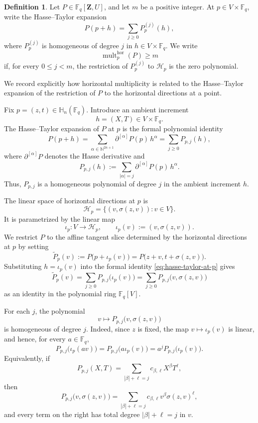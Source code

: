 \documentclass[11pt,letterpaper]{amsart}
\numberwithin{equation}{section}
\theoremstyle{definition}
\newtheorem{definition}[definition]{Definition}
\theoremstyle{remark}
\newcommand{\Fq}{\mathbb F_q}
\newcommand{\HH}{\mathbb H}
\begin{document}
\begin{definition}
\label{def:horizontal-multiplicity}
Let $P\in\Fq[\mathbf Z,U]$, and let $m$ be a positive integer.  At
$p\in V\times\Fq$, write the Hasse--Taylor expansion
\begin{equation}\label{eq:Hasse-expansion}
 P(p+h)=\sum_{j\geq0}P_p^{(j)}(h),
\end{equation}
where $P_p^{(j)}$ is homogeneous of degree $j$ in
$h\in V\times\Fq$. We write
\[
 \operatorname{mult}^{\mathrm{hor}}_p(P)\geq m
\]
if, for every $0\leq j<m$, the restriction of $P_p^{(j)}$ to
$\mathcal H_p$ is the zero polynomial.
\end{definition}
We record explicitly how horizontal multiplicity is related to the
Hasse--Taylor expansion of the restriction of $P$ to the horizontal
directions at a point.

Fix $p=(z,t)\in\HH_n(\Fq)$. Introduce an ambient increment
\[
 h=(X,T)\in V\times\Fq.
\]
The Hasse--Taylor expansion of $P$ at $p$ is the formal polynomial
identity
\begin{equation}\label{eq:hasse-taylor-at-p}
 P(p+h)
 =
 \sum_{\alpha\in\mathbb N^{2n+1}}
 \partial^{[\alpha]}P(p)\,h^\alpha
 =
 \sum_{j\geq0}P_{p,j}(h),
\end{equation}
where $\partial^{[\alpha]}P$ denotes the Hasse derivative and
\[
 P_{p,j}(h)
 :=
 \sum_{|\alpha|=j}
 \partial^{[\alpha]}P(p)\,h^\alpha.
\]
Thus, $P_{p,j}$ is a homogeneous polynomial of degree $j$ in the
ambient increment $h$.

The linear space of horizontal directions at $p$ is
\[
 \mathcal H_p
 =
 \bigl\{(v,\sigma(z,v)):v\in V\bigr\}.
\]
It is parametrized by the linear map
\[
 \iota_p:V\longrightarrow\mathcal H_p,
 \qquad
 \iota_p(v):=(v,\sigma(z,v)).
\]
We restrict $P$ to the affine tangent slice determined by the
horizontal directions at $p$ by setting
\[
 \widetilde P_p(v)
 :=
 P\bigl(p+\iota_p(v)\bigr)
 =
 P\bigl(z+v,t+\sigma(z,v)\bigr).
\]
Substituting $h=\iota_p(v)$ into the formal identity
\eqref{eq:hasse-taylor-at-p} gives
\begin{equation}\label{eq:restricted-hasse-taylor}
 \widetilde P_p(v)
 =
 \sum_{j\geq0}
 P_{p,j}\bigl(\iota_p(v)\bigr)
 =
 \sum_{j\geq0}
 P_{p,j}\bigl(v,\sigma(z,v)\bigr)
\end{equation}
as an identity in the polynomial ring $\Fq[V]$.

For each $j$, the polynomial
\[
 v\longmapsto P_{p,j}\bigl(v,\sigma(z,v)\bigr)
\]
is homogeneous of degree $j$. Indeed, since $z$ is fixed, the map
$v\mapsto\iota_p(v)$ is linear, and hence, for every $a\in\Fq$,
\[
 P_{p,j}\bigl(\iota_p(av)\bigr)
 =
 P_{p,j}\bigl(a\iota_p(v)\bigr)
 =
 a^jP_{p,j}\bigl(\iota_p(v)\bigr).
\]
Equivalently, if
\[
 P_{p,j}(X,T)
 =
 \sum_{|\beta|+\ell=j}
 c_{\beta,\ell}X^\beta T^\ell,
\]
then
\[
 P_{p,j}\bigl(v,\sigma(z,v)\bigr)
 =
 \sum_{|\beta|+\ell=j}
 c_{\beta,\ell}v^\beta\sigma(z,v)^\ell,
\]
and every term on the right has total degree
$|\beta|+\ell=j$ in $v$.
\end{document}
